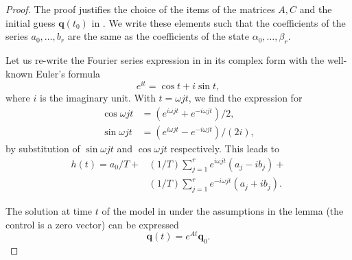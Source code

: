 \begin{proof}
The proof justifies the choice of the items of the matrices $A,C$ and the initial guess $\mathbf{q}(t_0)$ in . We write these elements such that the coefficients of the series $a_0,\dots,b_r$ are the same as the coefficients of the state $\alpha_0,\dots,\beta_r$.

Let us re-write the Fourier series expression in  in its complex form with the well-known Euler's formula 
\begin{equation}
  e^{it}=\cos{t}+i\sin{t},
\end{equation} 
where $i$ is the imaginary unit. 
With $t=\omega jt$, we find the expression for 
\begin{subequations}\begin{align}
  \cos{\omega jt}&=(e^{i\omega jt}+e^{-i\omega jt})/2,\\  
  \sin{\omega jt}&=(e^{i\omega jt}-e^{-i\omega jt})/(2i),
\end{align}\end{subequations}
by substitution of $\sin{\omega jt}$ and $\cos{\omega jt}$ respectively. This leads to~\citep{kuo1967automatic}
\begin{equation}\begin{split}\label{eq:proof-complex}
  h(t)=a_0/T+&(1/T)\sum_{j=1}^{r}{e^{i\omega jt}(a_j-ib_j)}+\\&(1/T)\sum_{j=1}^{r}{e^{-i\omega jt}(a_j+ib_j)}.
 \end{split}\end{equation} 

The solution at time $t$ of the model in  under the assumptions in the lemma (the control is a zero vector) can be expressed
\begin{equation}\label{eq:proof-sol}
  \mathbf{q}(t)=e^{At}\mathbf{q}_0.
\end{equation}


\end{proof}
